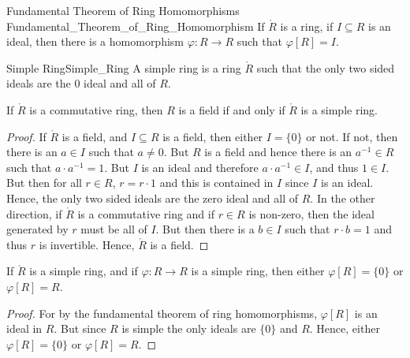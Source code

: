             \begin{ftheorem}{Fundamental Theorem of Ring Homomorphisms}
                            {Fundamental_Theorem_of_Ring_Homomorphism}
                If $\ring{R}$ is a ring, if $I\subseteq{R}$ is an ideal,
                then there is a homomorphism $\varphi:R\rightarrow{R}$ such
                that $\varphi[R]=I$.
            \end{ftheorem}
            \begin{fdefinition}{Simple Ring}{Simple_Ring}
                A simple ring is a ring $\ring{R}$ such that the only two
                sided ideals are the 0 ideal and all of $R$.
            \end{fdefinition}
            \begin{theorem}
                If $\ring{R}$ is a commutative ring, then $R$ is a field if
                and only if $\ring{R}$ is a simple ring.
            \end{theorem}
            \begin{proof}
                If $\ring{R}$ is a field, and $I\subseteq{R}$ is a field,
                then either $I=\{0\}$ or not. If not, then there is an
                $a\in{I}$ such that $a\ne{0}$. But $R$ is a field and hence
                there is an $a^{\minus{1}}\in{R}$ such that
                $a\cdot{a}^{\minus{1}}=1$. But $I$ is an ideal and therefore
                $a\cdot{a}^{\minus{1}}\in{I}$, and thus $1\in{I}$. But then
                for all $r\in{R}$, $r=r\cdot{1}$ and this is contained in
                $I$ since $I$ is an ideal. Hence, the only two sided ideals
                are the zero ideal and all of $R$. In the other direction,
                if $\ring{R}$ is a commutative ring and if $r\in{R}$ is
                non-zero, then the ideal generated by $r$ must be all of
                $I$. But then there is a $b\in{I}$ such that $r\cdot{b}=1$
                and thus $r$ is invertible. Hence, $\ring{R}$ is a field.
            \end{proof}
            \begin{theorem}
                If $\ring{R}$ is a simple ring, and if
                $\varphi:R\rightarrow{R}$ is a simple ring, then either
                $\varphi[R]=\{0\}$ or $\varphi[R]=R$.
            \end{theorem}
            \begin{proof}
                For by the fundamental theorem of ring homomorphisms,
                $\varphi[R]$ is an ideal in $R$. But since $R$ is simple
                the only ideals are $\{0\}$ and $R$. Hence, either
                $\varphi[R]=\{0\}$ or $\varphi[R]=R$.
            \end{proof}
